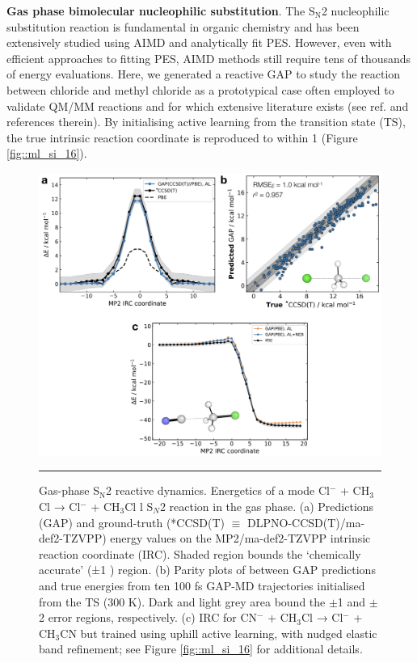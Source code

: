 \documentclass[../../main.tex]{subfiles}
\begin{document}
{\bfseries{Gas phase bimolecular nucleophilic substitution}}. The S${}_\text{N}$2 nucleophilic substitution reaction is fundamental in organic chemistry and has been extensively studied using AIMD and analytically fit PES.\cite{Pratihar2017, Xie2016} However, even with efficient approaches to fitting PES, AIMD methods still require tens of thousands of energy evaluations.\cite{Szabo2017} Here, we generated a reactive GAP to study the reaction between chloride and methyl chloride as a prototypical case often employed to validate QM/MM reactions and for which extensive literature exists (see ref. \cite{TiradoRives2019} and references therein). By initialising active learning from the transition state (TS), the true intrinsic reaction coordinate is reproduced to within 1 \kcalx (Figure \ref{fig::ml_si_16}). 


\begin{figure}[h!]
	\vspace{0.4cm}
	\centering
	\includegraphics[width=\textwidth]{6/gap/figs_ms/fig5}
	\vspace{0.2cm}
	\hrule
	\caption{Gas-phase S${}_\text{N}$2 reactive dynamics. Energetics of a mode Cl$^{-}$ + CH${}_3$Cl → Cl$^{-}$ + CH${}_3$Cl l S${}_N$2 reaction in the gas phase. (a) Predictions (GAP) and ground-truth (*CCSD(T) $\equiv$ DLPNO-CCSD(T)/ma-def2-TZVPP) energy values on the MP2/ma-def2-TZVPP intrinsic reaction coordinate (IRC). Shaded region bounds the ‘chemically accurate’ (±1 \kcal) region. (b) Parity plots of between GAP predictions and true energies from ten 100 fs GAP-MD trajectories initialised from the TS (300 K). Dark and light grey area bound the $\pm$1 \kcalx and $\pm$ 2 \kcalx error regions, respectively. (c) IRC for CN$^{-}$ + CH${}_3$Cl → Cl$^{-}$ + CH${}_3$CN but trained using uphill active learning, with nudged elastic band refinement; see Figure \ref{fig::ml_si_16} for additional details.}
	\label{fig::ml_5}
\end{figure}
\end{document}
